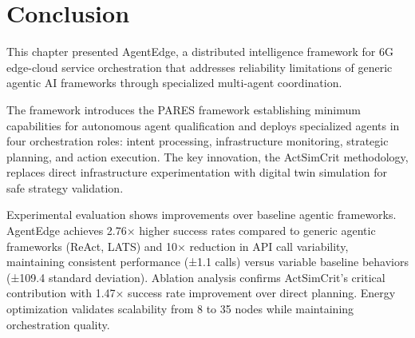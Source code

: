 \section{Conclusion}
\label{sec:ch5_conclusion}

This chapter presented \ac{AgentEdge}, a distributed intelligence framework for \ac{6G} edge-cloud service orchestration that addresses reliability limitations of generic agentic \ac{AI} frameworks through specialized multi-agent coordination.

The framework introduces the \ac{PARES} framework establishing minimum capabilities for autonomous agent qualification and deploys specialized agents in four orchestration roles: intent processing, infrastructure monitoring, strategic planning, and action execution. The key innovation, the \ac{ActSimCrit} methodology, replaces direct infrastructure experimentation with digital twin simulation for safe strategy validation.

Experimental evaluation shows improvements over baseline agentic frameworks. \ac{AgentEdge} achieves 2.76× higher success rates compared to generic agentic frameworks (\ac{ReAct}, \ac{LATS}) and 10× reduction in \ac{API} call variability, maintaining consistent performance (±1.1 calls) versus variable baseline behaviors (±109.4 standard deviation). Ablation analysis confirms \ac{ActSimCrit}'s critical contribution with 1.47× success rate improvement over direct planning. Energy optimization validates scalability from 8 to 35 nodes while maintaining orchestration quality.